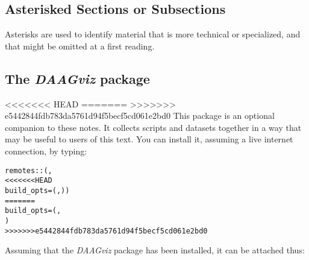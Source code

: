 \subsection*{Asterisked Sections or Subsections}

Asterisks are used to identify material that is more technical or
specialized, and that might be omitted at a first reading.

\subsection*{The {\em DAAGviz} package}
<<<<<<< HEAD
=======
>>>>>>> e5442844fdb783da5761d94f5becf5cd061e2bd0
This package is an optional companion to these notes. 
It collects scripts and datasets together in a way that may be
useful to users of this text.  
You can install it, assuming a live internet connection,
by typing:

\begin{fullwidth}

\begin{knitrout}
\color{fgcolor}\begin{kframe}
\begin{alltt}
remotes::(,
<<<<<<< HEAD
                        build_opts=(, ))
=======
                        build_opts=(, 
                                     )
>>>>>>> e5442844fdb783da5761d94f5becf5cd061e2bd0
\end{alltt}
\end{kframe}
\end{knitrout}

\end{fullwidth}

Assuming that the {\em DAAGviz} package has been installed, it can be attached thus:
\begin{knitrout}
\color{fgcolor}\begin{kframe}
\begin{alltt}
\end{alltt}
\end{kframe}
\end{knitrout}

